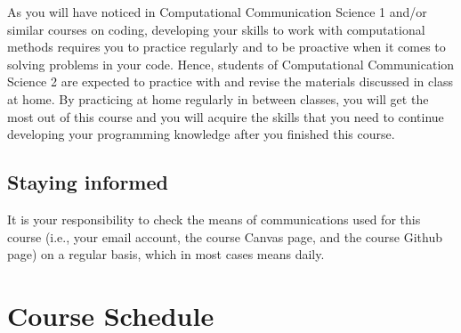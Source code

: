 \documentclass[a4paper,10pt,twocolumn]{report}
\begin{document}
	As you will have noticed in Computational Communication Science 1 and/or similar courses on coding, developing your skills to work with computational methods requires you to practice regularly and to be proactive when it comes to solving problems in your code. Hence, students of Computational Communication Science 2 are expected to practice with and revise the materials discussed in class at home. By practicing at home regularly in between classes, you will get the most out of this course and you will acquire the skills that you need to continue developing your programming knowledge after you finished this course.
	
	\section{Staying informed}
	It is your responsibility to check the means of communications used for this course (i.e., your email account, the course Canvas page, and the course Github page) on a regular basis, which in most cases means daily.
	
	
	
	\chapter{Course Schedule}
	
	
	
	
	
	
	
	
\end{document}
